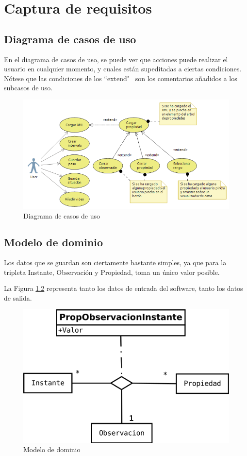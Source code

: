 \chapter{Captura de requisitos}
%

\section{Diagrama de casos de uso}
En el diagrama de casos de uso, se puede ver que acciones puede realizar el usuario en cualquier momento, y cuales
est\'an supeditadas a ciertas condiciones. N\'otese que las condiciones de los ``extend" \ son los comentarios a\~nadidos
a los subcasos de uso.

\begin{figure}[h]
\centering
\includegraphics[width=1.0\linewidth]{./Figures/useCaseDiagram.png}
\caption[Diagrama de casos de uso]{Diagrama de casos de uso}
\label{fig:useCaseDiagram}
\end{figure}


\section{Modelo de dominio}
Los datos que se guardan son ciertamente bastante simples, ya que para la tripleta Instante, Observaci\'on y Propiedad,
toma un \'unico valor posible. 

La Figura \ref{fig:ModelodeDominio} representa tanto los datos de entrada del software, tanto los datos
de salida.

\begin{figure}[H]
\centering
\includegraphics[width=0.7\linewidth]{./Figures/ModelodeDominio}
\caption[Modelo de dominio]{Modelo de dominio}
\label{fig:ModelodeDominio}
\end{figure}
